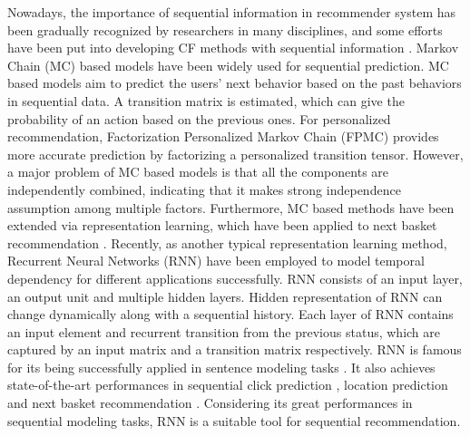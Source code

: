 \documentclass[conference]{IEEEtran}
\begin{document}
Nowadays, the importance of sequential information in recommender system has been gradually recognized by researchers in many disciplines, and some efforts have been put into developing CF methods with sequential information \cite{campos2014time}. Markov Chain (MC) based models \cite{yang2010personalizing,rendle2010factorizing,natarajan2013app,chen2015personalized} have been widely used for sequential prediction. MC based models aim to predict the users' next behavior based on the past behaviors in sequential data. A transition matrix is estimated, which can give the probability of an action based on the previous ones. For personalized recommendation, Factorization Personalized Markov Chain (FPMC) \cite{rendle2010factorizing} provides more accurate prediction by factorizing a personalized transition tensor. However, a major problem of MC based models is that all the components are independently combined, indicating that it makes strong independence assumption among multiple factors. Furthermore, MC based methods have been extended via representation learning, which have been applied to next basket recommendation \cite{wang2015learning}. Recently, as another typical representation learning method, Recurrent Neural Networks (RNN) have been employed to model temporal dependency for different applications successfully. RNN consists of an input layer, an output unit and multiple hidden layers. Hidden representation of RNN can change dynamically along with a sequential history. Each layer of RNN contains an input element and recurrent transition from the previous status, which are captured by an input matrix and a transition matrix respectively. RNN is famous for its being successfully applied in sentence modeling tasks \cite{mikolov2010recurrent,mikolov2011extensions,mikolov2011rnnlm}. It also achieves state-of-the-art performances in sequential click prediction \cite{zhang2014sequential}, location prediction \cite{liu2016strnn} and next basket recommendation \cite{yu2016dream}. Considering its great performances in sequential modeling tasks, RNN is a suitable tool for sequential recommendation.
\end{document}

